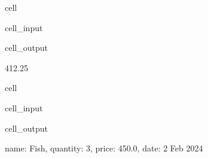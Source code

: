 \documentclass[letterpaper,10pt,english]{jupyterBook}
\begin{document}
\begin{sphinxuseclass}{cell}\begin{sphinxVerbatimInput}

\begin{sphinxuseclass}{cell_input}
\begin{sphinxVerbatim}[commandchars=\\\{\}]
\PYG{p}{[}\PYG{p}{]}
\end{sphinxVerbatim}

\end{sphinxuseclass}\end{sphinxVerbatimInput}
\begin{sphinxVerbatimOutput}

\begin{sphinxuseclass}{cell_output}
\begin{sphinxVerbatim}[commandchars=\\\{\}]
412.25
\end{sphinxVerbatim}

\end{sphinxuseclass}\end{sphinxVerbatimOutput}

\end{sphinxuseclass}
\begin{sphinxuseclass}{cell}\begin{sphinxVerbatimInput}

\begin{sphinxuseclass}{cell_input}
\begin{sphinxVerbatim}[commandchars=\\\{\}]
\PYG{p}{[}\PYG{p}{]}  
\end{sphinxVerbatim}

\end{sphinxuseclass}\end{sphinxVerbatimInput}
\begin{sphinxVerbatimOutput}

\begin{sphinxuseclass}{cell_output}
\begin{sphinxVerbatim}[commandchars=\\\{\}]
\PYGZob{}\PYGZsq{}name\PYGZsq{}: \PYGZsq{}Fish\PYGZsq{}, \PYGZsq{}quantity\PYGZsq{}: 3, \PYGZsq{}price\PYGZsq{}: 450.0, \PYGZsq{}date\PYGZsq{}: \PYGZsq{}2 Feb 2024\PYGZsq{}\PYGZcb{}
\end{sphinxVerbatim}

\end{sphinxuseclass}\end{sphinxVerbatimOutput}

\end{sphinxuseclass}
\end{document}
